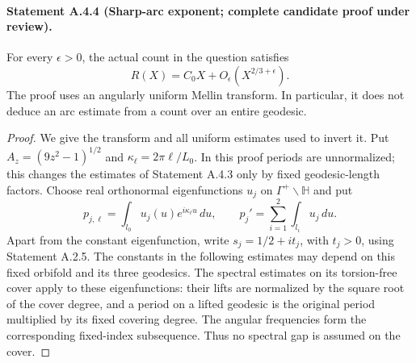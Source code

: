 \paragraph{Statement A.4.4 (Sharp-arc exponent; complete candidate proof under review).}
For every $\epsilon>0$, the actual count in the question satisfies
\begin{equation}\label{A:sharp-two-thirds}
 R(X)=C_0X+O_\epsilon(X^{2/3+\epsilon}).
\end{equation}
The proof uses an angularly uniform Mellin transform. In particular, it
does not deduce an arc estimate from a count over an entire geodesic.

\begin{proof}
We give the transform and all uniform estimates used to invert it.
Put $A_z=(9z^2-1)^{1/2}$ and $\kappa_\ell=2\pi\ell/L_0$.
In this proof periods are unnormalized; this changes the estimates of
Statement A.4.3 only by fixed geodesic-length factors. Choose real
orthonormal eigenfunctions $u_j$ on $\Gamma^+\backslash\mathbb H$ and put
\[
 p_{j,\ell}=\int_{l_0}u_j(u)e^{i\kappa_\ell u}\,du,
 \qquad p_j'=\sum_{i=1}^2\int_{l_i}u_j\,du.
\]
Apart from the constant eigenfunction, write $s_j=1/2+it_j$, with
$t_j>0$, using Statement A.2.5. The constants in the following estimates
may depend on this fixed orbifold and its three geodesics. The spectral
estimates on its torsion-free cover apply to these eigenfunctions:
their lifts are normalized by the square root of the cover degree,
and a period on a lifted geodesic is the original period multiplied by
its fixed covering degree. The angular frequencies form the corresponding
fixed-index subsequence. Thus no spectral gap is assumed on the cover.


\end{proof}
